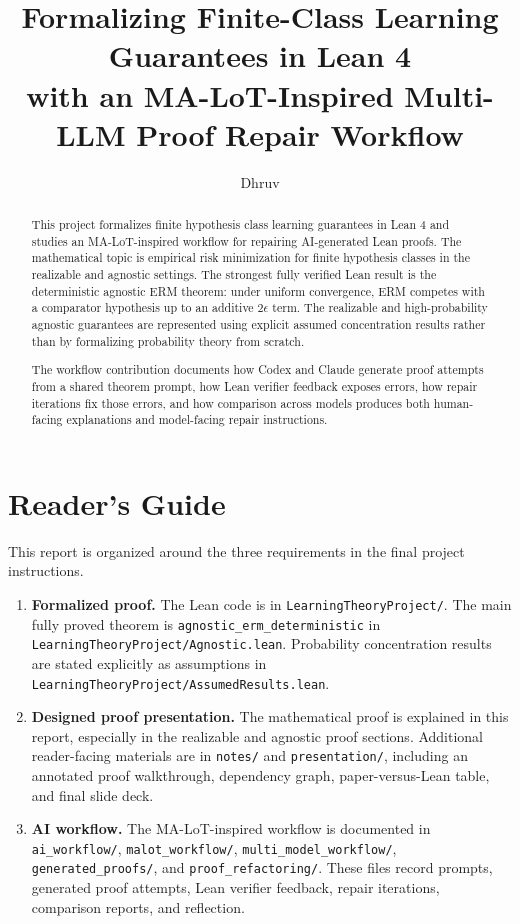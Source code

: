 \documentclass[11pt]{article}
\title{Formalizing Finite-Class Learning Guarantees in Lean 4\\
with an MA-LoT-Inspired Multi-LLM Proof Repair Workflow}
\author{Dhruv}
\date{}
\newcommand{\eps}{\epsilon}
\theoremstyle{definition}
\begin{document}
\maketitle

\begin{abstract}
This project formalizes finite hypothesis class learning guarantees in Lean 4
and studies an MA-LoT-inspired workflow for repairing AI-generated Lean proofs.
The mathematical topic is empirical risk minimization for finite hypothesis
classes in the realizable and agnostic settings. The strongest fully verified
Lean result is the deterministic agnostic ERM theorem: under uniform
convergence, ERM competes with a comparator hypothesis up to an additive
$2\eps$ term. The realizable and high-probability agnostic guarantees are
represented using explicit assumed concentration results rather than by
formalizing probability theory from scratch.

The workflow contribution documents how Codex and Claude generate proof
attempts from a shared theorem prompt, how Lean verifier feedback exposes
errors, how repair iterations fix those errors, and how comparison across
models produces both human-facing explanations and model-facing repair
instructions.
\end{abstract}

\tableofcontents

\section{Reader's Guide}

This report is organized around the three requirements in the final project
instructions.

\begin{enumerate}[leftmargin=*]
  \item \textbf{Formalized proof.} The Lean code is in
  \texttt{LearningTheoryProject/}. The main fully proved theorem is
  \texttt{agnostic\_erm\_deterministic} in
  \texttt{LearningTheoryProject/Agnostic.lean}. Probability concentration
  results are stated explicitly as assumptions in
  \texttt{LearningTheoryProject/AssumedResults.lean}.
  \item \textbf{Designed proof presentation.} The mathematical proof is
  explained in this report, especially in the realizable and agnostic proof
  sections. Additional reader-facing materials are in \texttt{notes/} and
  \texttt{presentation/}, including an annotated proof walkthrough, dependency
  graph, paper-versus-Lean table, and final slide deck.
  \item \textbf{AI workflow.} The MA-LoT-inspired workflow is documented in
  \texttt{ai\_workflow/}, \texttt{malot\_workflow/},
  \texttt{multi\_model\_workflow/}, \texttt{generated\_proofs/}, and
  \texttt{proof\_refactoring/}. These files record prompts, generated proof
  attempts, Lean verifier feedback, repair iterations, comparison reports, and
  reflection.
\end{enumerate}
\end{document}
